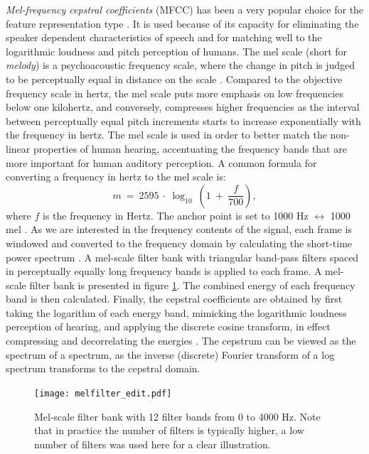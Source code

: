 \documentclass[english, 12pt, a4paper, pdftex, elec, utf8]{aaltothesis}
\begin{document}
\textit{Mel-frequency cepstral coefficients} (MFCC) has been a very popular choice for the feature representation type \cite{yu2014automatic, gales2008application, kallasjoki2016}. It is used because of its capacity for eliminating the speaker dependent characteristics of speech and for matching well to the logarithmic loudness and pitch perception of humans. The mel scale (short for \textit{melody}) is a psychoacoustic frequency scale, where the change in pitch is judged to be perceptually equal in distance on the scale \cite[p.~174]{pulkki2015communication}. Compared to the objective frequency scale in hertz, the mel scale puts more emphasis on low frequencies below one kilohertz, and conversely, compresses higher frequencies as the interval between perceptually equal pitch increments starts to increase exponentially with the frequency in hertz. The mel scale is used in order to better match the non-linear properties of human hearing, accentuating the frequency bands that are more important for human auditory perception. A common formula for converting a frequency in hertz to the mel scale is:
\begin{equation} \label{eq:mel}
m \ = \ 2595 \  \cdot \ \log_{10} \ \left(1 \ + \ \frac{f}{700} \right),
\end{equation} where $f$ is the frequency in Hertz. The anchor point is set to 1000 Hz $\leftrightarrow$ 1000 mel \cite[p.~174--175]{pulkki2015communication}. As we are interested in the frequency contents of the signal, each frame is windowed and converted to the frequency domain by calculating the short-time power spectrum \cite{gales2008application}. A mel-scale filter bank with triangular band-pass filters spaced in perceptually equally long frequency bands is applied to each frame. A mel-scale filter bank is presented in figure \ref{fig:melbank}. The combined energy of each frequency band is then calculated. Finally, the cepstral coefficients are obtained by first taking the logarithm of each energy band, mimicking the logarithmic loudness perception of hearing, and applying the discrete cosine transform, in effect compressing and decorrelating the energies \cite{huang2001spoken, gales2008application}. The cepstrum can be viewed as the spectrum of a spectrum, as the inverse (discrete) Fourier transform of a log spectrum transforms to the cepstral domain.
\begin{figure}[t]
	\centering
	\texttt{[image: melfilter\_edit.pdf]}
	\caption{Mel-scale filter bank with 12 filter bands from 0 to 4000 Hz. Note that in practice the number of filters is typically higher, a low number of filters was used here for a clear illustration.}
	\label{fig:melbank} 
\end{figure}
\end{document}
